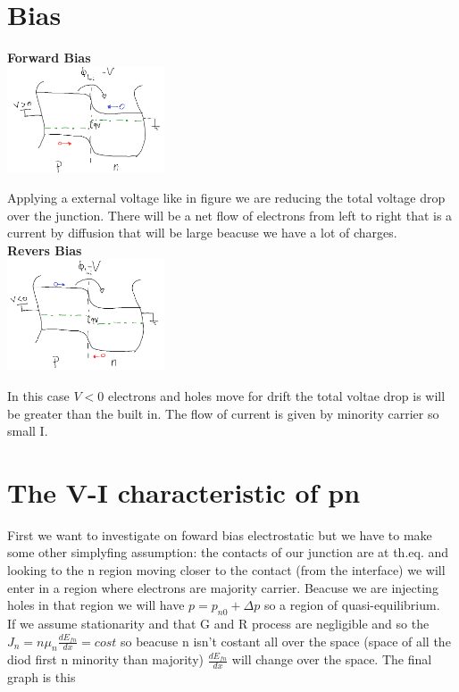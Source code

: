 \section{Bias}
{\bf Forward Bias}\\

\centering
\includegraphics[width=0.35\textwidth]{pn7.png}\\
\raggedright

Applying a external voltage like in figure we are reducing the total voltage drop over the junction. There will be a net flow of electrons from left to right that is a current by diffusion that will be large beacuse we have a lot of charges.\\
{\bf Revers Bias}\\

\centering
\includegraphics[width=0.35\textwidth]{pn8.png}\\
\raggedright

In this case $V<0$ electrons and holes move for drift the total voltae drop is will be greater than the built in. The flow of current is given by minority carrier so small I.\\

\section{The V-I characteristic of pn }
First we want to investigate on foward bias electrostatic but we have to make some other simplyfing assumption: the contacts of our junction are at th.eq. and looking to the n region moving closer to the contact (from the interface) we will enter in a region where electrons are majority carrier. Beacuse we are injecting holes in that region we will have $p=p_{n0}+\Delta p$ so a region of quasi-equilibrium.\\
If we assume stationarity and that G and R process are negligible and so the $J_n=n\mu_n \frac{dE_{fn}}{dx}=cost$ so beacuse n isn't costant all over the space (space of all the diod first n minority than majority) $\frac{dE_{fn}}{dx}$ will change over the space.
The final graph is this 

